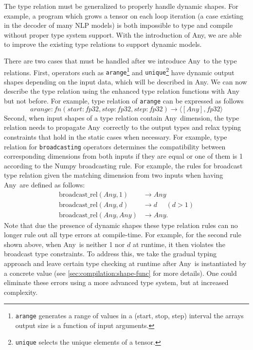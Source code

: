The type relation must be generalized to properly handle dynamic shapes. For example, a program which grows a tensor on each loop iteration (a case existing in the decoder of many NLP models) is both impossible to type and compile without proper type system support. With the introduction of Any, we are able to improve the existing type relations to support dynamic models.

There are two cases that must be handled after we introduce Any~to the type relations.
First, operators such as {\tt arange}\footnote{{\tt arange} generates a range of values in a (start, stop, step) interval the arrays output size is a function of input arguments.} and {\tt unique}\footnote{{\tt unique} selects the unique elements of a tensor.} have dynamic output shapes depending on the input data, which will be described in Any.
We can now describe the type relation using the enhanced type relation functions with Any but not before.
For example, type relation of {\tt arange} can be expressed as follows
\[
arange: fn(start: fp32, stop: fp32, step: fp32) \rightarrow \langle [Any], fp32 \rangle
\]
Second, when input shapes of a type relation contain Any~dimension, the type relation needs to propagate Any~correctly to the output types and relax typing constraints that hold in the static cases when necessary.
For example, type relation for {\tt broadcasting} operators determines the compatibility between corresponding
dimensions from both inputs if they are equal or one of them is 1 according to the Numpy broadcasting rule.
For example, the rules
for broadcast type relation given the matching dimension from two inputs when having Any~are defined as follows:
\begin{align*}
  \textrm{broadcast\_rel}(Any, 1) &\rightarrow Any \\
  \textrm{broadcast\_rel}(Any, d) &\rightarrow d ~~~~~~(d > 1) \\
  \textrm{broadcast\_rel}(Any, Any) &\rightarrow Any.
\end{align*}
Note that due the presence of dynamic shapes these type relation rules can no longer rule out all type errors at compile-time.
For example, for the second rule shown above, when Any~is neither 1 nor $d$ at runtime, it then violates the broadcast type constraints.
To address this, we take the gradual typing~\citep{gradualtyping} approach and leave certain type checking at runtime after Any~is instantiated by a
concrete value (see \autoref{sec:compilation:shape-func} for more details).
One could eliminate these errors using a more advanced type system, but at increased complexity.

